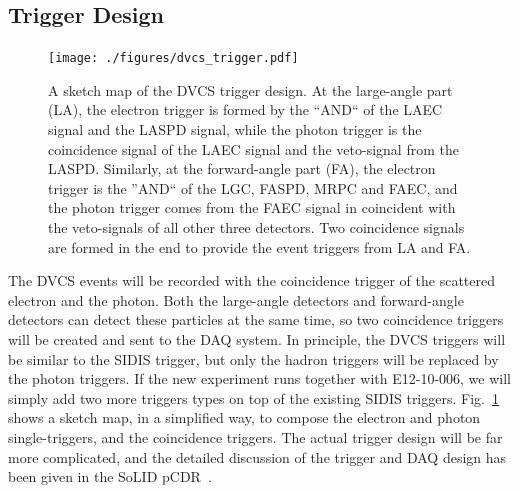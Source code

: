 \subsection{Trigger Design}
\begin{figure}[!ht]
 \begin{center}
  \texttt{[image: ./figures/dvcs\_trigger.pdf]}
   \caption[A sketch map of the DVCS trigger design]{\footnotesize{A sketch map of the DVCS trigger design. At the large-angle part (LA), the electron trigger is formed by the ``AND`` of the LAEC signal and the LASPD signal, while the photon trigger is the coincidence signal of the LAEC signal and the veto-signal from the LASPD. Similarly, at the forward-angle part (FA), the electron trigger is the ''AND`` of the LGC, FASPD, MRPC and FAEC, and the photon trigger comes from the FAEC signal in coincident with the veto-signals of all other three detectors. Two coincidence signals are formed in the end to provide the event triggers from LA and FA.}}
 \label{dvcs_trigger}
\end{center}
\end{figure}
The DVCS events will be recorded with the coincidence trigger of the scattered electron and the photon. Both the large-angle detectors and forward-angle detectors can detect these particles at the same time, so two coincidence triggers will be created and sent to the DAQ system.  In principle, the DVCS triggers will be similar to the SIDIS trigger, but only the hadron triggers will be replaced by the photon triggers. If the new experiment runs together with E12-10-006, we will simply add two more triggers types on top of the existing SIDIS triggers. Fig.~\ref{dvcs_trigger} shows a sketch map, in a simplified way, to compose the electron and photon single-triggers, and the coincidence triggers. The actual trigger design will be far more complicated, and the detailed discussion of the trigger and DAQ design has been given in the SoLID pCDR~\cite{solid_pcdr}.
